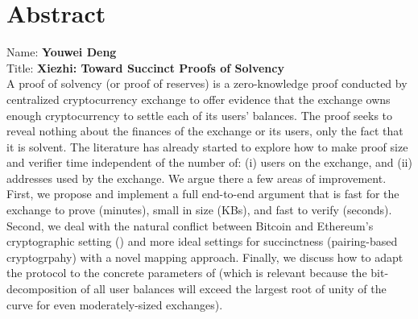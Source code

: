 
\chapter*{Abstract}

Name: 	\tab \textbf{Youwei Deng} \\
Title: 	\tab \textbf{Xiezhi: Toward Succinct Proofs of Solvency}\\

A proof of solvency (or proof of reserves) is a zero-knowledge proof conducted by centralized cryptocurrency exchange to offer evidence that the exchange owns enough cryptocurrency to settle each of its users' balances. The proof seeks to reveal nothing about the finances of the exchange or its users, only the fact that it is solvent. The literature has already started to explore how to make proof size and verifier time independent of the number of: (i) users on the exchange, and (ii) addresses used by the exchange. We argue there a few areas of improvement. First, we propose and implement a full end-to-end argument that is fast for the exchange to prove (minutes), small in size (KBs), and fast to verify (seconds). Second, we deal with the natural conflict between Bitcoin and Ethereum's cryptographic setting (\secp) and more ideal settings for succinctness (\eg pairing-based cryptogrpahy) with a novel mapping approach. Finally, we discuss how to adapt the protocol to the concrete parameters of \bls (which is relevant because the bit-decomposition of all user balances will exceed the largest root of unity of the curve for even moderately-sized exchanges).
